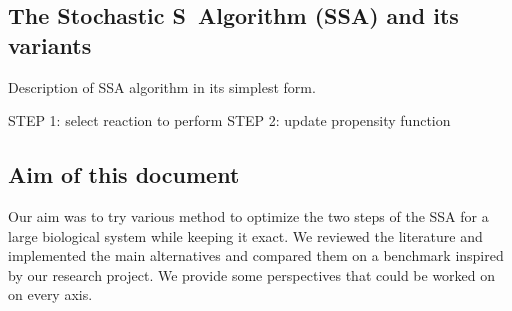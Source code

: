 \documentclass[12pt]{scrartcl}
\theoremstyle{definition}
\theoremstyle{remark}
\numberwithin{equation}{section}
\begin{document}
\subsection{The Stochastic S Algorithm (SSA) and its variants}

Description of SSA algorithm in its simplest form.

STEP 1: select reaction to perform
STEP 2: update propensity function

\subsection{Aim of this document}

Our aim was to try various method to optimize the two steps of the SSA for a large biological system while keeping it exact. We reviewed the literature and implemented the main alternatives and compared them on a benchmark inspired by our research project. We provide some perspectives that could be worked on on every axis.






\appendix

\end{document}
